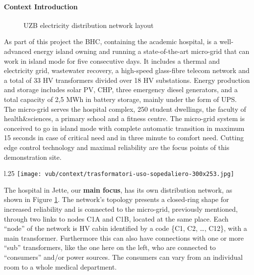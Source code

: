 \paragraph{Context Introduction}
\begin{figure}[ht]
    \caption{\acs{UZB} electricity distribution network layout}
    \label{fig:bhc_site_layout}
\end{figure}
As part of this project the \ac{BHC}, containing the academic hospital, is a well-advanced
energy island owning and running a state-of-the-art micro-grid that can work in island mode for five consecutive days.
It includes a thermal and electricity grid, wastewater recovery, a high-speed glass-fibre telecom network and a total of 33 \ac{HV} transformers divided over 18 \ac{HV} substations.
Energy production and storage includes solar PV, \ac{CHP}, three emergency diesel generators,
and a total capacity of 2,5 MWh in battery storage, mainly under the form of UPS.
The micro-grid serves the hospital complex, 250 student dwellings, the faculty of health\&sciences, a primary school and a fitness centre. 
The micro-grid system is conceived to go in island mode with complete automatic transition in maximum 15 seconds in case of critical need and in three minute to comfort need. 
Cutting edge control technology and maximal reliability are the focus points of this demonstration site.

\begin{wrapfigure}{l}{.25\textwidth}
    \centering
    \texttt{[image: vub/context/trasformatori-uso-sopedaliero-300x253.jpg]}
\end{wrapfigure}
The hospital in Jette, our \textbf{main focus}, has its own distribution network, as shown in Figure \ref{fig:bhc_site_layout}.
The network's topology presents a closed-ring shape for increased reliability and is connected to the micro-grid, previously mentioned,  
through two links to nodes C1A and C1B, located at the same place. Each ``node'' of the network is \ac{HV} cabin identified by a code \{C1, C2, \dots, C12\}, with a main transformer.
Furthermore this can also have connections with one or more ``sub'' transformers, like the one here on the left, 
who are connected to ``consumers'' and/or power sources. The consumers can vary from an individual room to a whole medical department.


